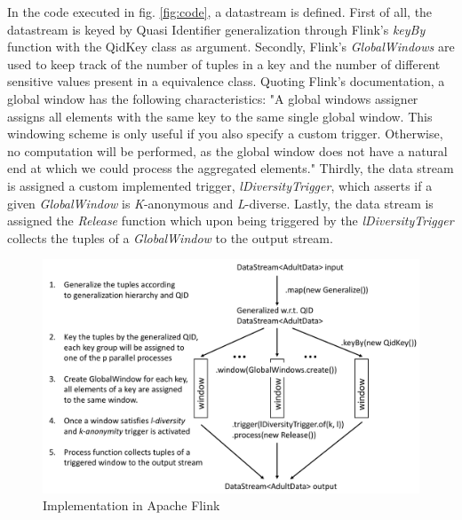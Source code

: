 \noindent In the code executed in fig. \ref{fig:code}, a datastream is defined. First of all, the datastream is keyed by Quasi Identifier generalization through Flink's \textit{keyBy} function with the QidKey class as argument. Secondly, Flink's \textit{GlobalWindows} are used to keep track of the number of tuples in a key and the number of different sensitive values present in a equivalence class. Quoting Flink's documentation, a global window has the following characteristics: "A global windows assigner assigns all elements with the same key to the same single global window. This windowing scheme is only useful if you also specify a custom trigger. Otherwise, no computation will be performed, as the global window does not have a natural end at which we could process the aggregated elements." \cite{flink} Thirdly, the data stream is assigned a custom implemented trigger, \textit{lDiversityTrigger}, which asserts if a given \textit{GlobalWindow} is \textit{K}-anonymous and \textit{L}-diverse. Lastly, the data stream is assigned the \textit{Release} function which upon being triggered by the \textit{lDiversityTrigger} collects the tuples of a \textit{GlobalWindow} to the output stream. 

\begin{figure}[H]
    \centering
    \includegraphics[scale=0.3]{Images/FlinkProcess_v2.png}
    \caption{Implementation in Apache Flink}
    \label{fig:flinkprocess}
\end{figure}
